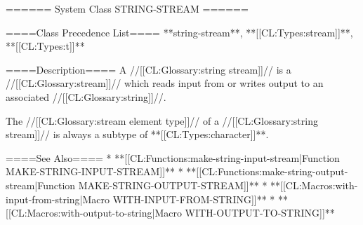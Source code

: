 ====== System Class STRING-STREAM ======

====Class Precedence List====
**string-stream**, **[[CL:Types:stream]]**, **[[CL:Types:t]]**

====Description====
A //[[CL:Glossary:string stream]]// is a //[[CL:Glossary:stream]]// which reads input from or writes output to an associated //[[CL:Glossary:string]]//.

The //[[CL:Glossary:stream element type]]// of a //[[CL:Glossary:string stream]]// is always a subtype of **[[CL:Types:character]]**.

====See Also====
  * **[[CL:Functions:make-string-input-stream|Function MAKE-STRING-INPUT-STREAM]]**
  * **[[CL:Functions:make-string-output-stream|Function MAKE-STRING-OUTPUT-STREAM]]**
  * **[[CL:Macros:with-input-from-string|Macro WITH-INPUT-FROM-STRING]]**
  * **[[CL:Macros:with-output-to-string|Macro WITH-OUTPUT-TO-STRING]]**

 
